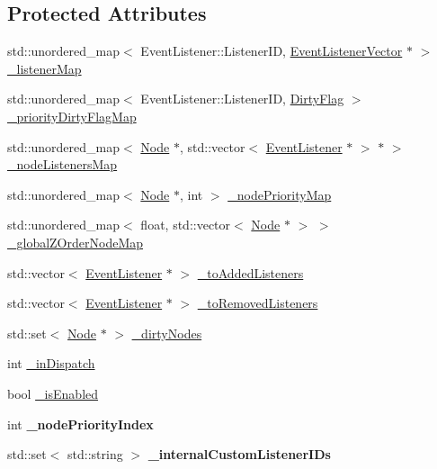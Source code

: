 \subsection*{Protected Attributes}
\begin{DoxyCompactItemize}
\item 
std\+::unordered\+\_\+map$<$ Event\+Listener\+::\+Listener\+ID, \hyperlink{classEventDispatcher_1_1EventListenerVector}{Event\+Listener\+Vector} $\ast$ $>$ \hyperlink{classEventDispatcher_ac083d564ea5455fa77ae318075b65087}{\+\_\+listener\+Map}
\item 
std\+::unordered\+\_\+map$<$ Event\+Listener\+::\+Listener\+ID, \hyperlink{classEventDispatcher_a05d949544dae4e41a1ba912ab962db33}{Dirty\+Flag} $>$ \hyperlink{classEventDispatcher_a8a4528d4e9cafee73b5730315d6863fb}{\+\_\+priority\+Dirty\+Flag\+Map}
\item 
std\+::unordered\+\_\+map$<$ \hyperlink{classNode}{Node} $\ast$, std\+::vector$<$ \hyperlink{classEventListener}{Event\+Listener} $\ast$ $>$ $\ast$ $>$ \hyperlink{classEventDispatcher_a892c5b82fa7e314d0968222d61688234}{\+\_\+node\+Listeners\+Map}
\item 
std\+::unordered\+\_\+map$<$ \hyperlink{classNode}{Node} $\ast$, int $>$ \hyperlink{classEventDispatcher_a4dd5c675f1b50ac7de363b37319d8977}{\+\_\+node\+Priority\+Map}
\item 
std\+::unordered\+\_\+map$<$ float, std\+::vector$<$ \hyperlink{classNode}{Node} $\ast$ $>$ $>$ \hyperlink{classEventDispatcher_a1bc2dcf1e5bbfda6bf505de08131d6b1}{\+\_\+global\+Z\+Order\+Node\+Map}
\item 
std\+::vector$<$ \hyperlink{classEventListener}{Event\+Listener} $\ast$ $>$ \hyperlink{classEventDispatcher_ab96e3a366e2ce099f839bb85710d23fb}{\+\_\+to\+Added\+Listeners}
\item 
std\+::vector$<$ \hyperlink{classEventListener}{Event\+Listener} $\ast$ $>$ \hyperlink{classEventDispatcher_a08ef695c1122ea1763b37de776eb7806}{\+\_\+to\+Removed\+Listeners}
\item 
std\+::set$<$ \hyperlink{classNode}{Node} $\ast$ $>$ \hyperlink{classEventDispatcher_a3a3cae6941714669117610e679effbae}{\+\_\+dirty\+Nodes}
\item 
int \hyperlink{classEventDispatcher_aaf59a5e64ade7b04dc3b037e954e5a3b}{\+\_\+in\+Dispatch}
\item 
bool \hyperlink{classEventDispatcher_a43f1858aaf2de64b7bab2f86cbfbd41e}{\+\_\+is\+Enabled}
\item 
\mbox{\label{classEventDispatcher_a2e4e164617ee3c31739cf693f3537786}} 
int {\bfseries \+\_\+node\+Priority\+Index}
\item 
\mbox{\label{classEventDispatcher_a57e84cdcff70216698f5ccdf53a6810d}} 
std\+::set$<$ std\+::string $>$ {\bfseries \+\_\+internal\+Custom\+Listener\+I\+Ds}
\end{DoxyCompactItemize}
